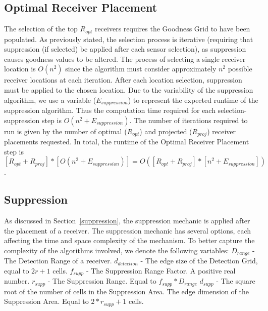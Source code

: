 \subsection{Optimal Receiver Placement}
The selection of the top $R_{opt}$ receivers requires the Goodness Grid to have been populated.  As previously stated, the selection process is iterative (requiring that suppression (if selected) be applied after each sensor selection), as suppression causes goodness values to be altered.  The process of selecting a single receiver location is $O(n^2)$ since the algorithm must consider approximately $n^2$ possible receiver locations at each iteration.  After each location selection, suppression must be applied to the chosen location.  Due to the variability of the suppression algorithm, we use a variable  ($E_{suppression}$) to represent the expected runtime of the suppression algorithm.  Thus the computation time required for each selection-suppression step is $O(n^2 + E_{suppression})$.  The number of iterations required to run is given by the number of optimal ($R_{opt}$) and projected ($R_{proj}$) receiver placements requested.  In total, the runtime of the Optimal Receiver Placement step is $[R_{opt} + R_{proj}] * [O(n^2 + E_{suppression})] = O([R_{opt} + R_{proj}]* [n^2 + E_{suppression}])$.


\subsection{Suppression}
As discussed in Section~\ref{suppression}, the suppression mechanic is applied after the placement of a receiver.  The suppression mechanic has several options, each affecting the time and space complexity of the mechanism.  To better capture the complexity of the algorithms involved, we denote the following variables: \newline
$D_{range}$ - The Detection Range of a receiver.\newline
$d_{detection}$ - The edge size of the Detection Grid, equal to $2r+1$ cells.\newline
$f_{supp}$ - The Suppression Range Factor.  A positive real number. \newline
$r_{supp}$ - The Suppression Range. Equal to $f_{supp}*D_{range}$\newline
$d_{supp}$ - The square root of the number of cells in the Suppression Area.  The edge dimension of the Suppression Area.  Equal to $2*r_{supp} + 1$ cells.\newline

